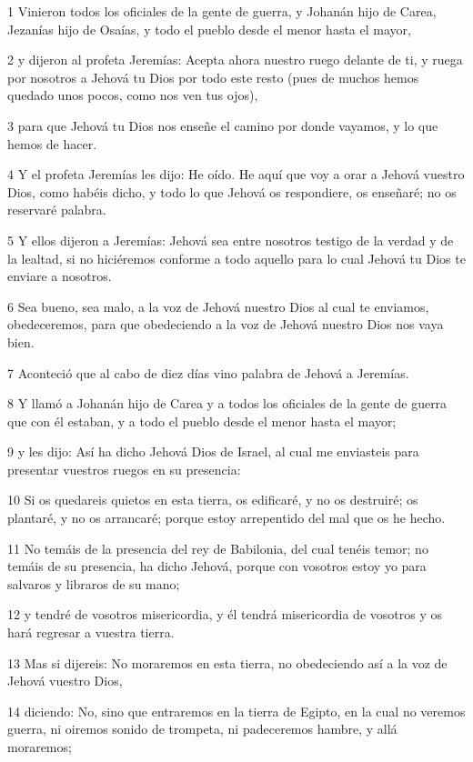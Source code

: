 \par 1 Vinieron todos los oficiales de la gente de guerra, y Johanán hijo de Carea, Jezanías hijo de Osaías, y todo el pueblo desde el menor hasta el mayor,
\par 2 y dijeron al profeta Jeremías: Acepta ahora nuestro ruego delante de ti, y ruega por nosotros a Jehová tu Dios por todo este resto (pues de muchos hemos quedado unos pocos, como nos ven tus ojos),
\par 3 para que Jehová tu Dios nos enseñe el camino por donde vayamos, y lo que hemos de hacer.
\par 4 Y el profeta Jeremías les dijo: He oído. He aquí que voy a orar a Jehová vuestro Dios, como habéis dicho, y todo lo que Jehová os respondiere, os enseñaré; no os reservaré palabra.
\par 5 Y ellos dijeron a Jeremías: Jehová sea entre nosotros testigo de la verdad y de la lealtad, si no hiciéremos conforme a todo aquello para lo cual Jehová tu Dios te enviare a nosotros.
\par 6 Sea bueno, sea malo, a la voz de Jehová nuestro Dios al cual te enviamos, obedeceremos, para que obedeciendo a la voz de Jehová nuestro Dios nos vaya bien. 
\par 7 Aconteció que al cabo de diez días vino palabra de Jehová a Jeremías.
\par 8 Y llamó a Johanán hijo de Carea y a todos los oficiales de la gente de guerra que con él estaban, y a todo el pueblo desde el menor hasta el mayor;
\par 9 y les dijo: Así ha dicho Jehová Dios de Israel, al cual me enviasteis para presentar vuestros ruegos en su presencia:
\par 10 Si os quedareis quietos en esta tierra, os edificaré, y no os destruiré; os plantaré, y no os arrancaré; porque estoy arrepentido del mal que os he hecho.
\par 11 No temáis de la presencia del rey de Babilonia, del cual tenéis temor; no temáis de su presencia, ha dicho Jehová, porque con vosotros estoy yo para salvaros y libraros de su mano;
\par 12 y tendré de vosotros misericordia, y él tendrá misericordia de vosotros y os hará regresar a vuestra tierra.
\par 13 Mas si dijereis: No moraremos en esta tierra, no obedeciendo así a la voz de Jehová vuestro Dios,
\par 14 diciendo: No, sino que entraremos en la tierra de Egipto, en la cual no veremos guerra, ni oiremos sonido de trompeta, ni padeceremos hambre, y allá moraremos;
